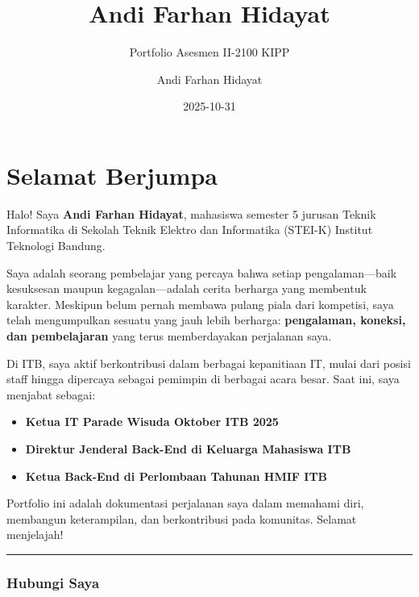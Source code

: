 \documentclass[
  letterpaper,
  DIV=11,
  numbers=noendperiod]{scrreprt}
\title{Andi Farhan Hidayat}
\subtitle{Portfolio Asesmen II-2100 KIPP}
\author{Andi Farhan Hidayat}
\date{2025-10-31}
\providecommand{\tightlist}{%
  \setlength{\itemsep}{0pt}\setlength{\parskip}{0pt}}
\renewcommand*\contentsname{Table of contents}
\newcommand\contentsname{Table of contents}
\begin{document}
\maketitle

\renewcommand*\contentsname{Table of contents}
{
\hypersetup{linkcolor=}
\setcounter{tocdepth}{2}
\tableofcontents
}


\chapter*{Selamat Berjumpa}\label{selamat-berjumpa}


Halo! Saya \textbf{Andi Farhan Hidayat}, mahasiswa semester 5 jurusan
Teknik Informatika di Sekolah Teknik Elektro dan Informatika (STEI-K)
Institut Teknologi Bandung.

Saya adalah seorang pembelajar yang percaya bahwa setiap
pengalaman---baik kesuksesan maupun kegagalan---adalah cerita berharga
yang membentuk karakter. Meskipun belum pernah membawa pulang piala dari
kompetisi, saya telah mengumpulkan sesuatu yang jauh lebih berharga:
\textbf{pengalaman, koneksi, dan pembelajaran} yang terus memberdayakan
perjalanan saya.

Di ITB, saya aktif berkontribusi dalam berbagai kepanitiaan IT, mulai
dari posisi staff hingga dipercaya sebagai pemimpin di berbagai acara
besar. Saat ini, saya menjabat sebagai:

\begin{itemize}
\tightlist
\item
  \textbf{Ketua IT Parade Wisuda Oktober ITB 2025}
\item
  \textbf{Direktur Jenderal Back-End di Keluarga Mahasiswa ITB}
\item
  \textbf{Ketua Back-End di Perlombaan Tahunan HMIF ITB}
\end{itemize}

Portfolio ini adalah dokumentasi perjalanan saya dalam memahami diri,
membangun keterampilan, dan berkontribusi pada komunitas. Selamat
menjelajah!

\begin{center}\rule{0.5\linewidth}{0.5pt}\end{center}

\subsection*{\texorpdfstring{\textbf{Hubungi
Saya}}{Hubungi Saya}}\label{hubungi-saya}
\end{document}
